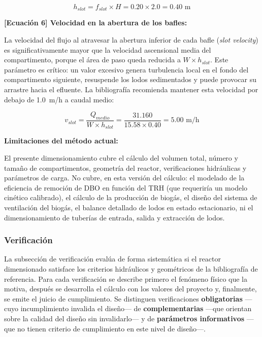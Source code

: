 \documentclass[12pt,a4paper]{article}
\begin{document}
\begin{equation}
h_{slot} = f_{slot} \times H = 0.20 \times 2.0 = 0.40 \text{ m}
\end{equation}

\textbf{[Ecuación 6] Velocidad en la abertura de los bafles:}

La velocidad del flujo al atravesar la abertura inferior de cada bafle (\textit{slot velocity}) es significativamente mayor que la velocidad ascensional media del compartimento, porque el área de paso queda reducida a $W \times h_{slot}$. Este parámetro es crítico: un valor excesivo genera turbulencia local en el fondo del compartimento siguiente, resuspende los lodos sedimentados y puede provocar su arrastre hacia el efluente. La bibliografía recomienda mantener esta velocidad por debajo de 1.0~m/h a caudal medio:

\begin{equation}
v_{slot} = \frac{Q_{medio}}{W \times h_{slot}} = \frac{31.160}{15.58 \times 0.40} = 5.00 \text{ m/h}
\end{equation}

\textbf{Limitaciones del método actual:}

El presente dimensionamiento cubre el cálculo del volumen total, número y tamaño de compartimentos, geometría del reactor, verificaciones hidráulicas y parámetros de carga. No cubre, en esta versión del cálculo: el modelado de la eficiencia de remoción de DBO en función del TRH (que requeriría un modelo cinético calibrado), el cálculo de la producción de biogás, el diseño del sistema de ventilación del biogás, el balance detallado de lodos en estado estacionario, ni el dimensionamiento de tuberías de entrada, salida y extracción de lodos.

\subsubsection{Verificación}

La subsección de verificación evalúa de forma sistemática si el reactor dimensionado satisface los criterios hidráulicos y geométricos de la bibliografía de referencia. Para cada verificación se describe primero el fenómeno físico que la motiva, después se desarrolla el cálculo con los valores del proyecto y, finalmente, se emite el juicio de cumplimiento. Se distinguen verificaciones \textbf{obligatorias} ---cuyo incumplimiento invalida el diseño--- de \textbf{complementarias} ---que orientan sobre la calidad del diseño sin invalidarlo--- y de \textbf{parámetros informativos} ---que no tienen criterio de cumplimiento en este nivel de diseño---.
\end{document}
